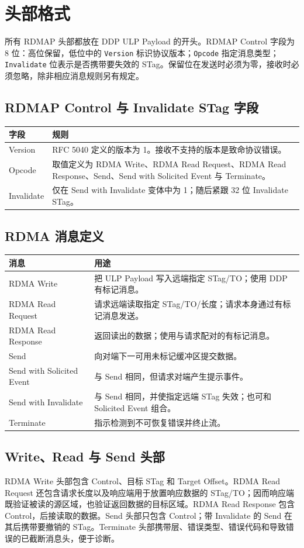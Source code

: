 \documentclass[11pt,a4paper]{article}
\newcommand{\kw}[1]{\texttt{#1}}
\begin{document}
\section{头部格式}
所有 RDMAP 头部都放在 DDP ULP Payload 的开头。RDMAP Control 字段为 8 位：高位保留，低位中的 \kw{Version} 标识协议版本；\kw{Opcode} 指定消息类型；\kw{Invalidate} 位表示是否携带要失效的 STag。保留位在发送时必须为零，接收时必须忽略，除非相应消息规则另有规定。
\subsection{RDMAP Control 与 Invalidate STag 字段}
\begin{longtable}{p{.27\linewidth}p{.64\linewidth}}
\toprule 字段 & 规则\\\midrule\endhead
Version & RFC 5040 定义的版本为 1。接收不支持的版本是致命协议错误。\\
Opcode & 取值定义为 RDMA Write、RDMA Read Request、RDMA Read Response、Send、Send with Solicited Event 与 Terminate。\\
Invalidate & 仅在 Send with Invalidate 变体中为 1；随后紧跟 32 位 Invalidate STag。\\
\bottomrule
\end{longtable}
\subsection{RDMA 消息定义}
\begin{longtable}{p{.25\linewidth}p{.67\linewidth}}
\toprule 消息 & 用途\\\midrule\endhead
RDMA Write & 把 ULP Payload 写入远端指定 STag/TO；使用 DDP 有标记消息。\\
RDMA Read Request & 请求远端读取指定 STag/TO/长度；请求本身通过有标记消息发送。\\
RDMA Read Response & 返回读出的数据；使用与请求配对的有标记消息。\\
Send & 向对端下一可用未标记缓冲区提交数据。\\
Send with Solicited Event & 与 Send 相同，但请求对端产生提示事件。\\
Send with Invalidate & 与 Send 相同，并使指定远端 STag 失效；也可和 Solicited Event 组合。\\
Terminate & 指示检测到不可恢复错误并终止流。\\
\bottomrule
\end{longtable}
\subsection{Write、Read 与 Send 头部}
RDMA Write 头部包含 Control、目标 STag 和 Target Offset。RDMA Read Request 还包含请求长度以及响应端用于放置响应数据的 STag/TO；因而响应端既验证被读的源区域，也验证返回数据的目标区域。RDMA Read Response 包含 Control，后接读取的数据。Send 头部只包含 Control；带 Invalidate 的 Send 在其后携带要撤销的 STag。Terminate 头部携带层、错误类型、错误代码和导致错误的已截断消息头，便于诊断。
\end{document}
